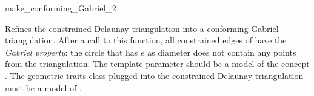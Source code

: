 \begin{ccRefFunction}{make_conforming_Gabriel_2}


{ Refines the constrained Delaunay triangulation  into a
  conforming Gabriel triangulation. After a call to this function, all
  constrained edges of  have the \emph{Gabriel property}: the
  circle that has $e$ as diameter does not contain any points from
  the triangulation.  
  \ccRequire The template parameter  should be a model of the
  concept . The geometric
  traits class plugged into the constrained Delaunay triangulation must be a
  model of .} 

\end{ccRefFunction}

